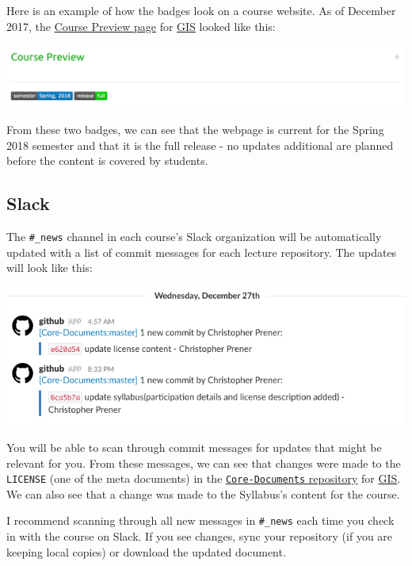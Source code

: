 \documentclass[]{book}
\theoremstyle{definition}
\theoremstyle{definition}
\theoremstyle{definition}
\theoremstyle{remark}
\begin{document}
Here is an example of how the badges look on a course website. As of
December 2017, the
\href{https://slu-soc5650.github.io/course-preview}{Course Preview page}
for \href{https://slu-soc5650.github.io/}{GIS} looked like this:

\begin{center}\includegraphics[width=0.95\linewidth]{images/webpageBadgesEx} \end{center}

From these two badges, we can see that the webpage is current for the
Spring 2018 semester and that it is the full release - no updates
additional are planned before the content is covered by students.

\subsection{Slack}\label{slack}

The \texttt{\#\_news} channel in each course's Slack organization will
be automatically updated with a list of commit messages for each lecture
repository. The updates will look like this:

\begin{center}\includegraphics[width=0.95\linewidth]{images/slackNews} \end{center}

You will be able to scan through commit messages for updates that might
be relevant for you. From these messages, we can see that changes were
made to the \texttt{LICENSE} (one of the meta documents) in the
\href{https://github.com/slu-soc5650/Core-Documents}{\texttt{Core-Documents}
repository} for \href{https://slu-soc5650.github.io/}{GIS}. We can also
see that a change was made to the Syllabus's content for the course.

I recommend scanning through all new messages in \texttt{\#\_news} each
time you check in with the course on Slack. If you see changes, sync
your repository (if you are keeping local copies) or download the
updated document.
\end{document}

